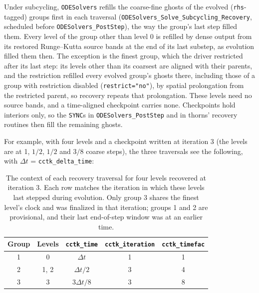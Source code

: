 Under subcycling, \texttt{ODESolvers} refills the coarse-fine ghosts of the evolved (\texttt{rhs}-tagged) groups first in each traversal (\texttt{ODESolvers\_Solve\_Subcycling\_Recovery}, scheduled before \texttt{ODESolvers\_PostStep}), the way the group's last step filled them. Every level of the group other than level 0 is refilled by dense output from its restored Runge--Kutta source bands at the end of its last substep, as evolution filled them then. The exception is the finest group, which the driver restricted after its last step: its levels other than its coarsest are aligned with their parents, and the restriction refilled every evolved group's ghosts there, including those of a group with restriction disabled (\texttt{restrict="no"}), by spatial prolongation from the restricted parent, so recovery repeats that prolongation. These levels need no source bands, and a time-aligned checkpoint carries none. Checkpoints hold interiors only, so the \texttt{SYNC}s in \texttt{ODESolvers\_PostStep} and in thorns' recovery routines then fill the remaining ghosts.

For example, with four levels and a checkpoint written at iteration 3 (the levels are at 1, $1/2$, $1/2$ and $3/8$ coarse steps), the three traversals see the following, with $\Delta t$ = \texttt{cctk\_delta\_time}:
%
\begin{table}[ht]
  \centering
  \begin{tabular}{ccccc}
  Group & Levels & \texttt{cctk\_time} & \texttt{cctk\_iteration} & \texttt{cctk\_timefac} \\ \hline\hline
  1 & 0 & $\Delta t$ & 1 & 1 \\
  2 & 1, 2 & $\Delta t/2$ & 3 & 4 \\
  3 & 3 & $3\Delta t/8$ & 3 & 8 \\ \hline\hline
  \end{tabular}
  \caption{The context of each recovery traversal for four levels recovered at iteration 3. Each row matches the iteration in which these levels last stepped during evolution. Only group 3 shares the finest level's clock and was finalized in that iteration; groups 1 and 2 are provisional, and their last end-of-step window was at an earlier time.}
  \label{tab:recovery_example}
\end{table}


